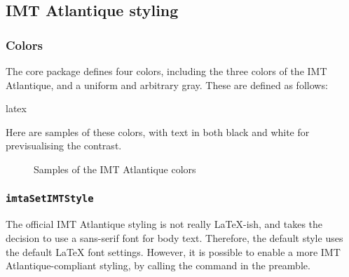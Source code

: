 \documentclass{report}
\begin{document}
\subsection{IMT Atlantique styling}
\subsubsection{Colors}
The core package defines four colors, including the three colors of the IMT Atlantique, and a uniform and arbitrary gray.
These are defined as follows:

\begin{imtaCode}{latex}
\end{imtaCode}

Here are samples of these colors, with text in both black and white for previsualising the contrast.

\begin{figure}[H]
    \centering
    \caption{Samples of the IMT Atlantique colors}
    \label{fig:imtaColors}
\end{figure}

\subsubsection{\texttt{imtaSetIMTStyle}}
The official IMT Atlantique styling is not really \LaTeX-ish, and takes the decision to use a sans-serif font for body text.
Therefore, the default style uses the default \LaTeX{} font settings.
However, it is possible to enable a more IMT Atlantique-compliant styling, by calling the  command in the preamble.
\end{document}
